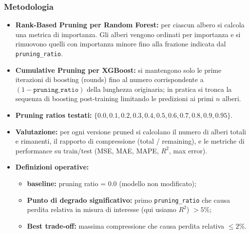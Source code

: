 \documentclass[a4paper,12pt]{report}
\begin{document}
	\subsubsection{Metodologia}
	\begin{itemize}
		\item \textbf{Rank-Based Pruning per Random Forest:} per ciascun albero si calcola una metrica di importanza. Gli alberi vengono ordinati per importanza e si rimuovono quelli con importanza minore fino alla frazione indicata dal \texttt{pruning\_ratio}.
		\item \textbf{Cumulative Pruning per XGBoost:} si mantengono solo le prime iterazioni di boosting (rounds) fino al numero corrispondente a \((1 - \texttt{pruning\_ratio})\) della lunghezza originaria; in pratica si tronca la sequenza di boosting post-training limitando le predizioni ai primi $n$ alberi.
		\item \textbf{Pruning ratios testati:} \(\{0.0, 0.1, 0.2, 0.3, 0.4, 0.5, 0.6, 0.7, 0.8, 0.9, 0.95\}\).
		\item \textbf{Valutazione:} per ogni versione pruned si calcolano il numero di alberi totali e rimanenti, il rapporto di compressione (total / remaining), e le metriche di performance su train/test (MSE, MAE, MAPE, \(R^2\), max error).
		\item \textbf{Definizioni operative:}
		\begin{itemize}
			\item \textbf{baseline:} pruning ratio = 0.0 (modello non modificato);
			\item \textbf{Punto di degrado significativo:} primo \texttt{pruning\_ratio} che causa perdita relativa in misura di interesse (qui usiamo \(R^2\)) \(>5\%\);
			\item \textbf{Best trade-off:} massima compressione che causa perdita relativa \(\le 2\%\).
		\end{itemize}
	\end{itemize}
	
\end{document}
